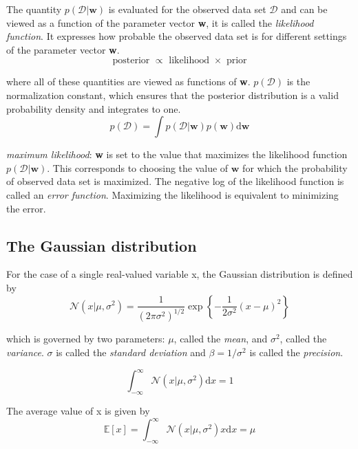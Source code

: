 \documentclass[5p,sort&compress]{elsarticle}
\begin{document}
The quantity $p(\mathcal{D}|\textbf{w})$ is evaluated for the observed data set $\mathcal{D}$ and can be viewed as a function of the parameter vector \textbf{w}, it is called the \textit{likelihood function}. It expresses how probable the observed data set is for different settings of the parameter vector \textbf{w}. 
\begin{equation}
\text { posterior } \propto \text { likelihood } \times \text { prior }
\end{equation}

where all of these quantities are viewed as functions of \textbf{w}. $p(\mathcal{D})$ is the normalization constant, which ensures that the posterior distribution is a valid probability density and integrates to one.
\begin{equation}
p(\mathcal{D})=\int p(\mathcal{D} | \mathbf{w}) p(\mathbf{w}) \mathrm{d} \mathbf{w}
\end{equation}

\textit{maximum likelihood}: \textbf{w} is set to the value that maximizes the likelihood function $p(\mathcal{D}|\textbf{w})$. This corresponds to choosing the value of $\textbf{w}$ for which the probability of observed data set is maximized. The negative log of the likelihood function is called an \textit{error function}. Maximizing the likelihood is equivalent to minimizing the error.

\subsection{The Gaussian distribution}

For the case of a single real-valued variable x, the Gaussian distribution is defined by
\begin{equation}
\mathcal{N}\left(x | \mu, \sigma^{2}\right)=\frac{1}{\left(2 \pi \sigma^{2}\right)^{1 / 2}} \exp \left\{-\frac{1}{2 \sigma^{2}}(x-\mu)^{2}\right\}
\end{equation}

which is governed by two parameters: $\mu$, called the \textit{mean}, and $\sigma^2$, called the \textit{variance}. $\sigma$ is called the \textit{standard deviation} and $\beta=1/\sigma^2$ is called the \textit{precision}.


\begin{equation}
\int_{-\infty}^{\infty} \mathcal{N}\left(x | \mu, \sigma^{2}\right) \mathrm{d} x=1
\end{equation}

The average value of x is given by
\begin{equation}
\mathbb{E}[x]=\int_{-\infty}^{\infty} \mathcal{N}\left(x | \mu, \sigma^{2}\right) x \mathrm{d} x=\mu
\end{equation}
\end{document}
